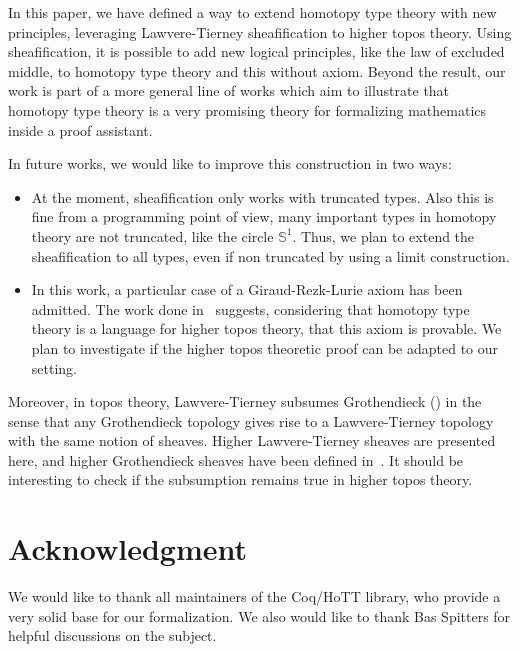 \documentclass[conference]{IEEEtran}
\begin{document}
In this paper, we have defined a way to extend homotopy type theory
with new principles, leveraging Lawvere-Tierney sheafification to
higher topos theory. 
%
Using sheafification, it is possible to add new logical principles,
like the law of excluded middle, to homotopy type theory and this
without axiom.
%
Beyond the result, our work is part of a more general line of works
which aim to illustrate that homotopy type theory is a very promising
theory for formalizing mathematics inside a proof assistant.


In future works, we would like to improve this construction in two
ways:
\begin{itemize}
\item 
  At the moment, sheafification only works with truncated
  types. Also this is fine from a programming point of view, 
  many important types in homotopy theory are not
  truncated, like the circle $\mathbb S^1$.  Thus, we plan to extend
  the sheafification to all types, even if non truncated by using a
  limit construction.
\item 
  In this work, a particular case of a Giraud-Rezk-Lurie axiom has
  been admitted. The work done in~\cite[Chapter 6]{lurie} suggests,
  considering that homotopy type theory is a language for higher topos
  theory, that this axiom is provable. We plan to investigate if the
  higher topos theoretic proof can be adapted to our setting. 
\end{itemize}
Moreover, in topos theory, Lawvere-Tierney subsumes Grothendieck
(\cite[Section~V.4]{maclanemoerdijk}) in the sense that any
Grothendieck topology gives rise to a Lawvere-Tierney topology with
the same notion of sheaves. Higher Lawvere-Tierney sheaves are
presented here, and higher Grothendieck sheaves have been defined
in~\cite{lurie}. It should be interesting to check if the subsumption
remains true in higher topos theory.







\section*{Acknowledgment}

We would like to thank all maintainers of the Coq/HoTT library, who
provide a very solid base for our formalization. We also would like
to thank Bas Spitters for helpful discussions on the subject.
\end{document}
